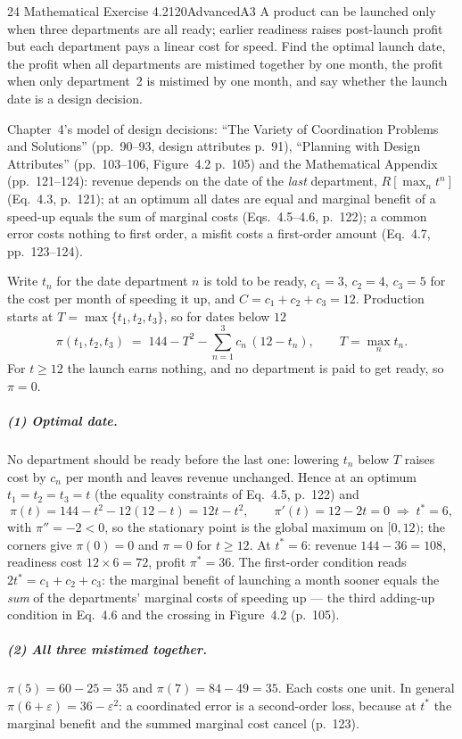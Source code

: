 \begin{exsol}{24}{\MR{} Mathematical Exercise 4.2}{120}{Advanced}{A3}
\asked A product can be launched only when three departments are all ready; earlier readiness raises
post-launch profit but each department pays a linear cost for speed. Find the optimal launch date,
the profit when all departments are mistimed together by one month, the profit when only
department~2 is mistimed by one month, and say whether the launch date is a design decision.

\method Chapter~4's model of design decisions: ``The Variety of Coordination Problems and
Solutions'' (pp.~90--93, design attributes p.~91), ``Planning with Design Attributes''
(pp.~103--106, Figure~4.2 p.~105) and the Mathematical Appendix (pp.~121--124): revenue depends on
the date of the \emph{last} department, $R[\max_n t^n]$ (Eq.~4.3, p.~121); at an optimum all dates
are equal and marginal benefit of a speed-up equals the sum of marginal costs (Eqs.~4.5--4.6,
p.~122); a common error costs nothing to first order, a misfit costs a first-order amount
(Eq.~4.7, pp.~123--124).

\solution
Write $t_n$ for the date department $n$ is told to be ready, $c_1=3$, $c_2=4$, $c_3=5$ for the
cost per month of speeding it up, and $C=c_1+c_2+c_3=12$. Production starts at
$T=\max\{t_1,t_2,t_3\}$, so for dates below $12$
\[
  \pi(t_1,t_2,t_3) \;=\; 144-T^2-\sum_{n=1}^{3} c_n\,(12-t_n),\qquad T=\max_n t_n .
\]
For $t\ge 12$ the launch earns nothing, and no department is paid to get ready, so $\pi=0$.

\subparagraph{(1) Optimal date.} No department should be ready before the last one: lowering
$t_n$ below $T$ raises cost by $c_n$ per month and leaves revenue unchanged. Hence at an optimum
$t_1=t_2=t_3=t$ (the equality constraints of Eq.~4.5, p.~122) and
\[
  \pi(t)=144-t^2-12(12-t)=12t-t^2,\qquad \pi'(t)=12-2t=0\;\Longrightarrow\; t^*=6,
\]
with $\pi''=-2<0$, so the stationary point is the global maximum on $[0,12)$; the corners give
$\pi(0)=0$ and $\pi=0$ for $t\ge12$. At $t^*=6$: revenue $144-36=108$, readiness cost
$12\times6=72$, profit $\pi^*=36$. The first-order condition reads $2t^*=c_1+c_2+c_3$: the marginal
benefit of launching a month sooner equals the \emph{sum} of the departments' marginal costs of
speeding up --- the third adding-up condition in Eq.~4.6 and the crossing in Figure~4.2 (p.~105).

\subparagraph{(2) All three mistimed together.} $\pi(5)=60-25=35$ and $\pi(7)=84-49=35$. Each
costs one unit. In general $\pi(6+\varepsilon)=36-\varepsilon^2$: a coordinated error is a
second-order loss, because at $t^*$ the marginal benefit and the summed marginal cost cancel
(p.~123).


\end{exsol}
